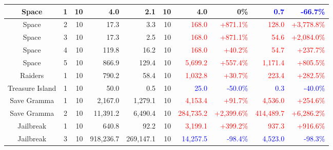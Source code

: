 \documentclass[letterpaper]{article} %
\begin{document}
\begin{table}[t]
\begin{tabular}{|c c | r r r | r r r r r |}
 Space & 1 & 10 & 4.0 & 2.1 & 10 & 4.0 & 0\% & \textcolor{blue}{0.7} & \textcolor{blue}{-66.7\%}\\
 \hline
 
 Space & 2 & 10 & 17.3 & 3.3 & 10 & \textcolor{red}{168.0} & \textcolor{red}{+871.1\%} & \textcolor{red}{128.0} & \textcolor{red}{+3,778.8\%} \\
 \hline
 
 Space & 3 & 10 & 17.3 & 2.5 & 10 & \textcolor{red}{168.0} & \textcolor{red}{+871.1\%} & \textcolor{red}{54.6} & \textcolor{red}{+2,084.0\%}\\
 \hline
 
 Space & 4 & 10 & 119.8 & 16.2 & 10 & \textcolor{red}{168.0} & \textcolor{red}{+40.2\%} & \textcolor{red}{54.7} & \textcolor{red}{+237.7\%} \\
 \hline
 
 Space & 5 & 10 & 866.9 & 129.4 & 10 & \textcolor{red}{5,699.2} & \textcolor{red}{+557.4\%} & \textcolor{red}{1,171.4} & \textcolor{red}{+805.5\%}\\
 \hline
 
 Raiders & 1 & 10 & 790.2 & 58.4 & 10 & \textcolor{red}{1,032.8} & \textcolor{red}{+30.7\%}& \textcolor{red}{223.4} & \textcolor{red}{+282.5\%} \\
 \hline
 
 Treasure Island & 1 & 10 & 50.0 & 0.5 & 10 & \textcolor{blue}{25.0} & \textcolor{blue}{-50.0\%} & \textcolor{blue}{0.3} & \textcolor{blue}{-40.0\%}\\
 \hline
 
 Save Gramma & 1 & 10 & 2,167.0 & 1,279.1 & 10 & \textcolor{red}{4,153.4} & \textcolor{red}{+91.7\%} & \textcolor{red}{4,536.0} & \textcolor{red}{+254.6\%}\\
 
 \hline
 Save Gramma & 2 & 10 & 11,391.2 & 6,490.4 & 10 & \textcolor{red}{284,735.2} & \textcolor{red}{+2,399.6\%} & \textcolor{red}{414,489.7} & \textcolor{red}{+6,286.2\%}\\
 \hline
 
 Jailbreak & 1 & 10 & 640.8 & 92.2 & 10 & \textcolor{red}{3,199.1} & \textcolor{red}{+399.2\%} & \textcolor{red}{937.3} & \textcolor{red}{+916.6\%}\\
 \hline
 
 Jailbreak & 3 & 10 & 918,236.7 & 269,147.1 & 10 & \textcolor{blue}{14,257.5} & \textcolor{blue}{-98.4\%} & \textcolor{blue}{4,523.0} & \textcolor{blue}{-98.3\%}\\
 \hline
 

\end{tabular}
\end{table}
\end{document}
